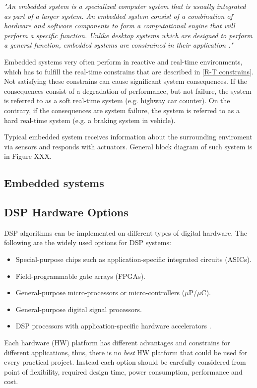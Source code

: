 \documentclass[twoside]{ctuthesis}
\theoremstyle{plain}
\theoremstyle{definition}
\theoremstyle{note}
\begin{document}
\textit{"An embedded system is a specialized computer system that is usually integrated as part of a larger system. An embedded system consist of a combination of hardware and software components to form a computational engine that will perform a specific function. Unlike desktop systems which are designed to perform a general function, embedded systems are constrained in their application \cite{cite:SE_for_ES}."}

Embedded systems very often perform in reactive and real-time environments, which has to fulfill the real-time constrains that are described in \ref{R-T constrains}. Not satisfying these constrains can cause significant system consequences. If the consequences consist of a degradation of performance, but not failure, the system is referred to as a soft real-time system (e.g. highway car counter). On the contrary, if the consequences are system failure, the system is referred to as a hard real-time system (e.g. a braking system in vehicle). 

Typical embedded system receives information about the surrounding enviroment via sensors and responds with actuators. General block diagram of such system is in Figure XXX.																	
\subsection{Embedded systems}

\subsection{DSP Hardware Options}
DSP algorithms can be implemented on different types of digital hardware. The following are the widely used options for DSP systems:
\begin{itemize}
	\setlength{\itemsep}{5pt}
\item Special-purpose chips such as application-specific integrated circuits (ASICs).
\item Field-programmable gate arrays (FPGAs).
\item General-purpose micro-processors or micro-controllers ($\mu$P/$\mu$C).
\item General-purpose digital signal processors.
\item DSP processors with application-specific hardware accelerators \cite{cite:RT_DSP}.
\end{itemize}

Each hardware (HW) platform has different advantages and constrains for different applications, thus, there is no \textit{best} HW platform that could be used for every practical project. Instead each option should be carefully considered from point of flexibility, required design time, power consumption, performance and cost. 
\end{document}

